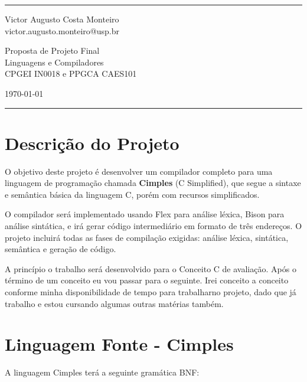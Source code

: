 \documentclass[10pt, a4paper]{article}
\begin{document}
\fancyhead[C]{}
\hrule \medskip 
\begin{minipage}{0.295\textwidth} 
    \raggedright
    \footnotesize
    Victor Augusto Costa Monteiro \hfill\\   
    victor.augusto.monteiro@usp.br
\end{minipage}
\begin{minipage}{0.4\textwidth} 
    \centering 
    \large 
    Proposta de Projeto Final\\ 
    \normalsize 
    Linguagens e Compiladores\\CPGEI IN0018 e PPGCA CAES101\\ 
\end{minipage}
\begin{minipage}{0.295\textwidth} 
    \raggedleft
    \today\hfill\\
\end{minipage}
\medskip\hrule 

\section{Descrição do Projeto}

O objetivo deste projeto é desenvolver um compilador completo para uma linguagem 
de programação chamada \textbf{Cimples} (C Simplified), que segue a sintaxe e 
semântica básica da linguagem C, porém com recursos simplificados.

O compilador será implementado usando Flex para análise léxica, Bison para 
análise sintática, e irá gerar código intermediário em formato de 
três endereços. O projeto incluirá todas as fases de compilação exigidas: 
análise léxica, sintática, semântica e geração de código.

A princípio o trabalho será desenvolvido para o Conceito C de avaliação. 
Após o término de um conceito eu vou passar para o seguinte. 
Irei conceito a conceito conforme minha disponibilidade de tempo 
para trabalharno projeto, dado que já trabalho e estou cursando 
algumas outras matérias também.


\section{Linguagem Fonte - Cimples}

A linguagem Cimples terá a seguinte gramática BNF:
\end{document}
